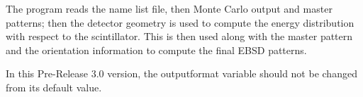 \documentclass[DIV=calc, paper=letter, fontsize=11pt]{scrartcl}	 %
\begin{document}
The program reads the name list file, then Monte Carlo output and master patterns;  then the detector geometry is used to
compute the energy distribution with respect to the scintillator.  This is then used along with the master pattern and the 
orientation information to compute the final EBSD patterns.  
%

{\color{red}In this Pre-Release 3.0 version, the outputformat variable should not be changed from its default value.}
\end{document}
